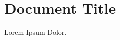 \documentclass[11pt]{report}
\begin{document}
\label{}
    \section{Document Title}

    Lorem Ipsum Dolor.
\end{document}
